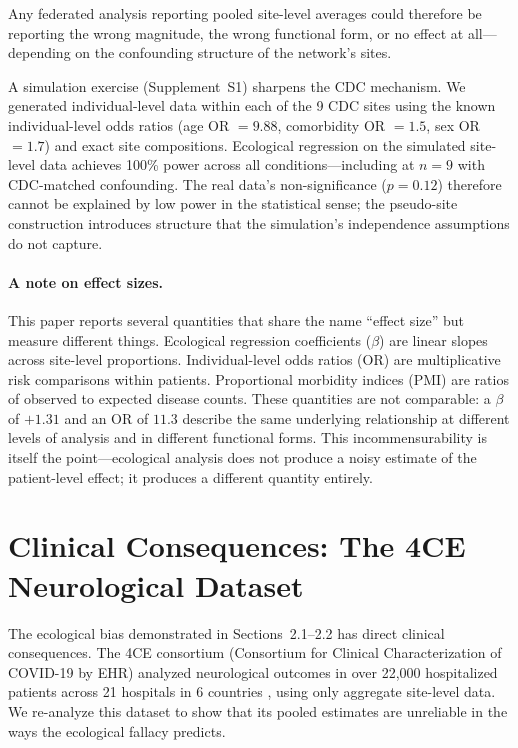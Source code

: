 \documentclass{article}
\begin{document}
Any federated analysis reporting pooled site-level averages could therefore
be reporting the wrong magnitude, the wrong functional form, or no effect
at all---depending on the confounding structure of the network's sites.

A simulation exercise (Supplement~S1) sharpens the CDC mechanism.  We
generated individual-level data within each of the 9 CDC sites using
the known individual-level odds ratios (age OR $= 9.88$, comorbidity
OR $= 1.5$, sex OR $= 1.7$) and exact site compositions.  Ecological
regression on the simulated site-level data achieves 100\% power across
all conditions---including at $n = 9$ with CDC-matched confounding.  The
real data's non-significance ($p = 0.12$) therefore cannot be explained
by low power in the statistical sense; the pseudo-site construction
introduces structure that the simulation's independence assumptions do
not capture.

\paragraph{A note on effect sizes.}
This paper reports several quantities that share the name ``effect size''
but measure different things.  Ecological regression coefficients ($\beta$)
are linear slopes across site-level proportions.  Individual-level odds
ratios (OR) are multiplicative risk comparisons within patients.
Proportional morbidity indices (PMI) are ratios of observed to expected
disease counts.  These quantities are not comparable: a $\beta$ of $+1.31$
and an OR of $11.3$ describe the same underlying relationship at different
levels of analysis and in different functional forms.  This
incommensurability is itself the point---ecological analysis does not
produce a noisy estimate of the patient-level effect; it produces a
different quantity entirely.


\section{Clinical Consequences: The 4CE Neurological Dataset}

The ecological bias demonstrated in Sections~2.1--2.2 has direct clinical
consequences.  The 4CE consortium (Consortium for Clinical Characterization
of COVID-19 by EHR) analyzed neurological outcomes in over 22,000
hospitalized patients across 21 hospitals in 6 countries
\cite{four_ce_neuro2021}, using only aggregate site-level data.  We
re-analyze this dataset to show that its pooled estimates are unreliable
in the ways the ecological fallacy predicts.
\end{document}
